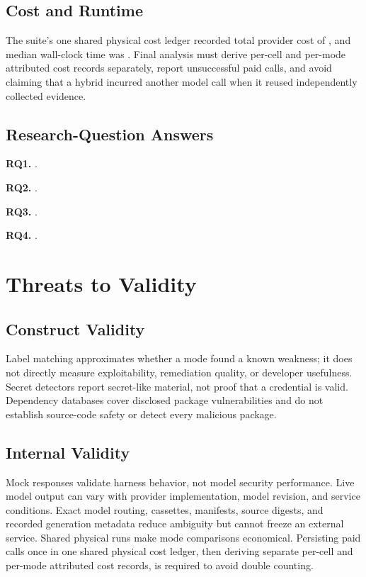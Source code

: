 \documentclass[sigconf,nonacm]{acmart}
\begin{document}
\subsection{Cost and Runtime}
The suite's one shared physical cost ledger recorded total provider cost of \TotalPhysicalCost{}, and median wall-clock time was \MedianWallClockTime{}. Final analysis must derive per-cell and per-mode attributed cost records separately, report unsuccessful paid calls, and avoid claiming that a hybrid incurred another model call when it reused independently collected evidence.

\subsection{Research-Question Answers}
\textbf{RQ1.} \ResultPending.

\textbf{RQ2.} \ResultPending.

\textbf{RQ3.} \ResultPending.

\textbf{RQ4.} \ResultPending.

\section{Threats to Validity}

\subsection{Construct Validity}
Label matching approximates whether a mode found a known weakness; it does not directly measure exploitability, remediation quality, or developer usefulness. Secret detectors report secret-like material, not proof that a credential is valid. Dependency databases cover disclosed package vulnerabilities and do not establish source-code safety or detect every malicious package.

\subsection{Internal Validity}
Mock responses validate harness behavior, not model security performance. Live model output can vary with provider implementation, model revision, and service conditions. Exact model routing, cassettes, manifests, source digests, and recorded generation metadata reduce ambiguity but cannot freeze an external service. Shared physical runs make mode comparisons economical. Persisting paid calls once in one shared physical cost ledger, then deriving separate per-cell and per-mode attributed cost records, is required to avoid double counting.
\end{document}
